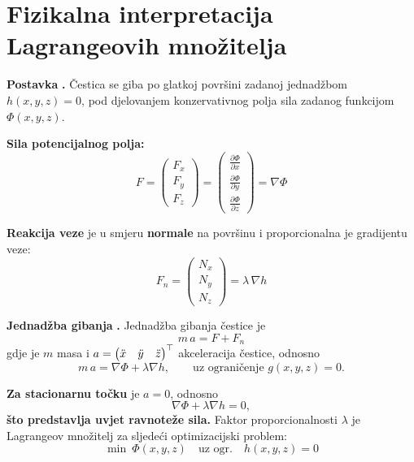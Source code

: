 \section{Fizikalna interpretacija Lagrangeovih množitelja}
\label{sec:fizikalna-interpretacija}

\textbf{Postavka} \textbf{.} Čestica se giba po glatkoj površini zadanoj
jednadžbom $h(x,y,z) = 0$, pod djelovanjem konzervativnog polja sila zadanog
funkcijom $\Phi(x,y,z)$.

\textbf{Sila potencijalnog polja:}
\[
F = \begin{pmatrix} F_x \\ F_y \\ F_z \end{pmatrix}
  = \begin{pmatrix}
    \frac{\partial \Phi}{\partial x} \\
    \frac{\partial \Phi}{\partial y} \\
    \frac{\partial \Phi}{\partial z}
    \end{pmatrix} = \nabla\Phi
\]

\textbf{Reakcija veze} je u smjeru \textbf{normale} na površinu i proporcionalna
je gradijentu veze:
\[
F_n = \begin{pmatrix} N_x \\ N_y \\ N_z \end{pmatrix} = \lambda\,\nabla h
\]

\textbf{Jednadžba gibanja} \textbf{.} Jednadžba gibanja čestice je
\[
m\,a = F + F_n
\]
gdje je $m$ masa i $a = \begin{pmatrix}\ddot x & \ddot y & \ddot z\end{pmatrix}^{\top}$
akceleracija čestice, odnosno
\[
m\,a = \nabla\Phi + \lambda\nabla h, \qquad\text{uz ograničenje } g(x,y,z) = 0.
\]

\textbf{Za stacionarnu točku} je $a = 0$, odnosno
\[
\nabla\Phi + \lambda\nabla h = 0,
\]
\textbf{što predstavlja uvjet ravnoteže sila.} Faktor proporcionalnosti
$\lambda$ je Lagrangeov množitelj za sljedeći optimizacijski problem:
\[
\min\ \Phi(x,y,z) \quad\text{uz ogr.}\quad h(x,y,z) = 0
\]

